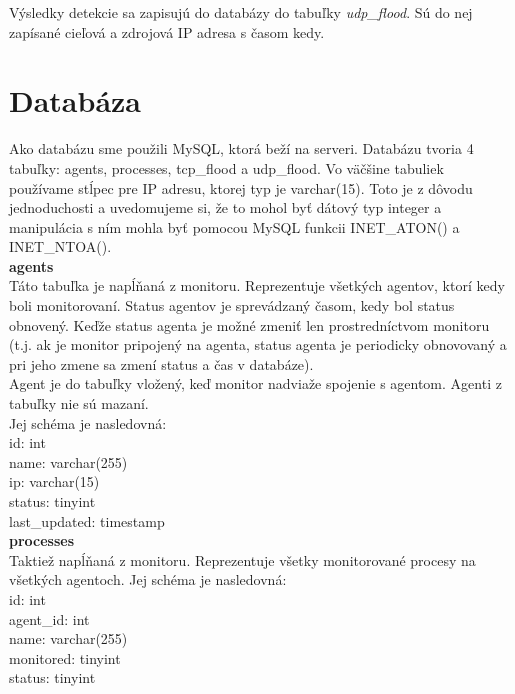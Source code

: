 \documentclass[a4paper,12pt]{article}
\begin{document}
Výsledky detekcie sa zapisujú do databázy do tabuľky \textit{udp\_flood}. Sú do nej zapísané cieľová a zdrojová IP adresa s časom kedy. \\
\newpage

\section{Databáza}
Ako databázu sme použili MySQL, ktorá beží na serveri. Databázu tvoria 4 tabuľky: agents, processes, tcp\_flood a udp\_flood. Vo väčšine tabuliek používame stĺpec pre IP adresu, ktorej typ je varchar(15). Toto je z dôvodu jednoduchosti a uvedomujeme si, že to mohol byť dátový typ integer a manipulácia s ním mohla byť pomocou MySQL funkcii INET\_ATON() a INET\_NTOA(). \\

\noindent \textbf{agents} \\

Táto tabuľka je napĺňaná z monitoru. Reprezentuje všetkých agentov, ktorí kedy boli monitorovaní. Status agentov je sprevádzaný časom, kedy bol status obnovený. Keďže status agenta je možné zmeniť len prostredníctvom monitoru (t.j. ak je monitor pripojený na agenta, status agenta je periodicky obnovovaný a pri jeho zmene sa zmení status a čas v databáze). \\

Agent je do tabuľky vložený, keď monitor nadviaže spojenie s agentom. Agenti z tabuľky nie sú mazaní. \\

Jej schéma je nasledovná: \\

\noindent id: int \\
name: varchar(255) \\
ip: varchar(15) \\
status: tinyint \\
last\_updated: timestamp \\

\noindent \textbf{processes} \\

Taktiež napĺňaná z monitoru. Reprezentuje všetky monitorované procesy na všetkých agentoch. Jej schéma je nasledovná: \\

\noindent id: int \\
agent\_id: int \\
name: varchar(255) \\
monitored: tinyint \\
status: tinyint \\
\end{document}
